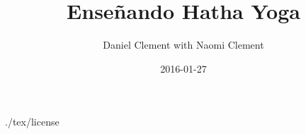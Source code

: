 \documentclass[a4paper]{book}
\title{Enseñando Hatha Yoga}
\date{2016-01-27}
\author{Daniel Clement with Naomi Clement}
\begin{document}
\maketitle


\frontmatter
 {./tex/license}
\tableofcontents


\mainmatter








\end{document}
